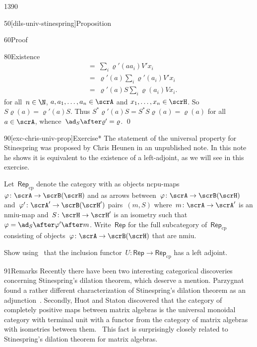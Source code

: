 \begin{parsec}{1390}
\begin{point}{50}[dils-univ-stinespring]{Proposition}
\begin{point}{60}{Proof}
\begin{point}{80}{Existence}
\begin{align*}
    &\ =\  \sum_i \varrho'(aa_i) V'x_i \\
    &\  =\ \varrho'(a) \sum_i \varrho'(a_i)V'x_i\\
    &\ =\ \varrho'(a) S \sum_i \varrho(a_i)V x_i.
\end{align*}
for all~$n \in \N$, $a, a_1, \ldots, a_n \in \scrA$ and
    $x_1, \ldots, x_n \in \scrH$.
So~$S \varrho(a) = \varrho'(a)S$.
Thus $S^* \varrho'(a) S = S^*S\varrho(a) = \varrho(a)$ for all~$a\in \scrA$,
whence~$\ad_S \after \varrho' = \varrho$. \qed
\end{point}
\end{point}
\end{point}

\spacingfix{}
\begin{point}{90}[exc-chris-univ-prop]{Exercise*}%
    The statement of the universal property
        for Stinespring
        was proposed by Chris Heunen in an unpublished note.
    In this note he shows it is equivalent to the existence
        of a left-adjoint, as we will see in this exercise.
    
    Let~$\mathsf{Rep}_{\mathrm{cp}}$
        denote the category with as objects
            ncpu-maps~$\varphi\colon \scrA \to \scrB(\scrH)$
            and as arrows between~$\varphi\colon \scrA \to \scrB(\scrH)$
            and~$\varphi'\colon \scrA' \to \scrB(\scrH')$
            pairs~$(m, S)$
            where~$m\colon \scrA \to \scrA'$ is an nmiu-map
            and~$S\colon \scrH \to \scrH'$ is an isometry
            such that~$\varphi = \ad_S \after \varphi' \after m$.
    Write~$\mathsf{Rep}$
        for the full subcategory of~$\mathsf{Rep}_{\mathrm{cp}}$
        consisting of objects~$\varphi\colon \scrA \to \scrB(\scrH)$
            that are nmiu.

Show using~
    that the inclusion functor~$U \colon \mathsf{Rep}
    \to \mathsf{Rep}_{\mathrm{cp}}$ has a left adjoint.
\begin{point}{91}{Remarks}%
Recently there have been two interesting categorical
    discoveries concerning Stinespring's dilation theorem,
    which deserve a mention.
Parzygnat found a rather different characterization
    of Stinespring's dilation
    theorem as an adjunction~\cite{parzygnat2018stinespring}.
Secondly, Huot and Staton discovered
    that the category of completely positive maps
    between matrix algebras
    is the universal monoidal category with terminal unit
    with a functor from the category of matrix algebras
    with isometries between them.~\cite{huot}
This fact is surprisingly closely related
    to Stinespring's dilation theorem for matrix algebras.
\end{point}


\end{point}
\end{parsec}
